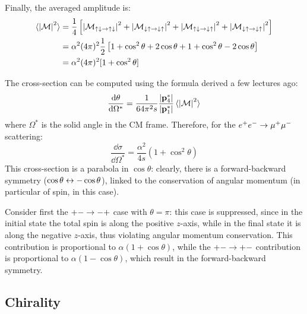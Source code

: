 Finally, the averaged amplitude is:
\begin{equation*}
  \begin{split}
    \braket{\left\lvert\mathcal{M}\right\rvert^2}
    & = \frac{1}{4} \left[ \left\lvert\mathcal{M}_{\uparrow \downarrow \rightarrow \uparrow \downarrow}\right\rvert^2 + \left\lvert\mathcal{M}_{\downarrow \uparrow \rightarrow \downarrow \uparrow}\right\rvert^2 + \left\lvert\mathcal{M}_{\uparrow \downarrow \rightarrow \downarrow \uparrow}\right\rvert^2 + \left\lvert\mathcal{M}_{\downarrow \uparrow \rightarrow \downarrow \uparrow}\right\rvert^2 \right] \\
    & = \alpha^2 (4\pi)^2 \frac{1}{2} \left[ 1 + \cos^2 \theta + 2 \cos \theta + 1 + \cos^2 \theta - 2 \cos \theta \right] \\
    & = \alpha^2 (4\pi)^2 [1 + \cos^2 \theta]
  \end{split}
\end{equation*}

The cross-section can be computed using the formula derived a few lectures ago:
\begin{equation}
  \frac{\mathrm{d} \theta}{\mathrm{d} \Omega^*} = \frac{1}{64\pi^2 s} \frac{\left\lvert\mathbf{p}_4^*\right\rvert}{\left\lvert\mathbf{p}_1^*\right\rvert} \braket{\left\lvert\mathcal{M}\right\rvert^2}
\end{equation}
where $ \Omega^* $ is the solid angle in the CM frame. Therefore, for the $ e^+ e^- \rightarrow \mu^+ \mu^- $ scattering:
\begin{equation}
  \frac{\dd \sigma}{\dd \Omega^*} = \frac{\alpha^2}{4s} (1 + \cos^2 \theta)
\end{equation}
This cross-section is a parabola in $ \cos \theta $: clearly, there is a forward-backward symmetry ($ \cos \theta \leftrightarrow - \cos \theta $), linked to the conservation of angular momentum (in particular of spin, in this case).

Consider first the $ + - \rightarrow - + $ case with $ \theta = \pi $: this case is suppressed, since in the initial state the total spin is along the positive $ z $-axis, while in the final state it is along the negative $ z $-axis, thus violating angular momentum conservation. %
This contribution is proportional to $ \alpha (1 + \cos \theta) $, while the $ + - \rightarrow + - $ contribution is proportional to $ \alpha (1 - \cos \theta) $, which result in the forward-backward symmetry.

\subsection{Chirality}

